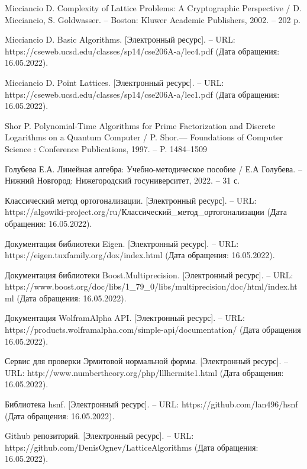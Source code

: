 \newpage


\begin{thebibliography}{10}


Micciancio D. Complexity of Lattice Problems: A Cryptographic Perspective / D. Micciancio, S. Goldwasser. -- Boston: Kluwer Academic Publishers, 2002. -- 202 p.

Micciancio D. Basic Algorithms. [Электронный ресурс]. -- URL: https://cseweb.ucsd.edu/classes/sp14/cse206A-a/lec4.pdf (Дата обращения: 16.05.2022).

Micciancio D. Point Lattices. [Электронный ресурс]. -- URL: https://cseweb.ucsd.edu/classes/sp14/cse206A-a/lec1.pdf (Дата обращения: 16.05.2022).

Shor P. Polynomial-Time Algorithms for Prime Factorization and Discrete Logarithms on a Quantum Computer / P. Shor.--- Foundations of Computer Science : Conference Publications, 1997. -- P. 1484–1509

Голубева Е.А. Линейная алгебра: Учебно-методическое
пособие / Е.А Голубева. -- Нижний Новгород: Нижегородский госуниверситет, 2022. -- 31 с.

Классический метод ортогонализации. [Электронный ресурс]. -- URL: https://algowiki-project.org/ru/Классический\_метод\_ортогонализации (Дата обращения: 16.05.2022).

Документация библиотеки Eigen. [Электронный ресурс]. -- URL: https://eigen.tuxfamily.org/dox/index.html (Дата обращения: 16.05.2022).

Документация библиотеки Boost.Multiprecision. [Электронный ресурс]. -- URL: https://www.boost.org/doc/libs/1\_79\_0/libs/multiprecision/doc/html/index.html (Дата обращения: 16.05.2022).

Документация WolframAlpha API. [Электронный ресурс]. -- URL: https://products.wolframalpha.com/simple-api/documentation/ (Дата обращения 16.05.2022).

Сервис для проверки Эрмитовой нормальной формы. [Электронный ресурс]. -- URL: http://www.numbertheory.org/php/lllhermite1.html (Дата обращения: 16.05.2022).

Библиотека hsnf. [Электронный ресурс]. -- URL: https://github.com/lan496/hsnf (Дата обращения: 16.05.2022).

Github репозиторий. [Электронный ресурс]. -- URL: https://github.com/DenisOgnev/Lat\-tice\-Algorithms (Дата обращения: 16.05.2022).
 

\end{thebibliography}

\clearpage